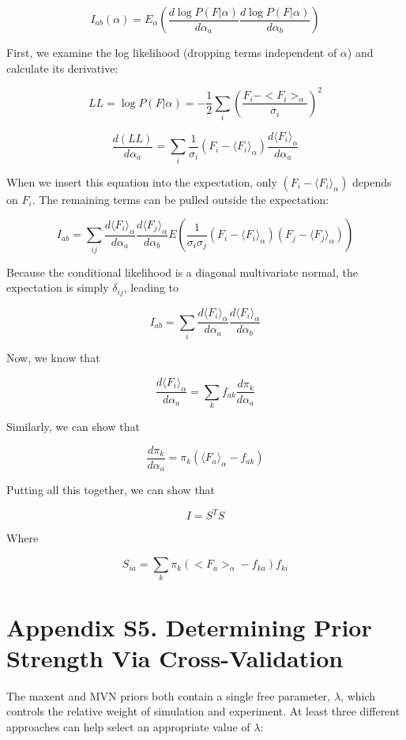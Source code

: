 \documentclass[journal=jacsat,manuscript=article]{achemso}
\begin{document}
$$I_{ab}(\alpha) = E_\alpha(\frac{d\log P(F|\alpha)}{d\alpha_{a}}\frac{d\log P(F|\alpha)}{d\alpha_{b}})$$

First, we examine the log likelihood (dropping terms independent of $\alpha$) and calculate its derivative:

$$LL = \log P(F|\alpha) = - \frac{1}{2}\sum_i (\frac{F_i - <F_i>_\alpha}{\sigma_i})^2$$

$$\frac{d(LL)}{d\alpha_a} = \sum_i \frac{1}{\sigma_i}(F_i - \langle F_i \rangle_\alpha) \frac{d\langle F_i \rangle_\alpha}{d\alpha_a}$$

When we insert this equation into the expectation, only $(F_i - \langle F_i \rangle_\alpha)$ depends on $F_i$.  The remaining terms can be pulled outside the expectation:

$$I_{ab} = \sum_{ij} \frac{d\langle F_i \rangle_\alpha}{d\alpha_a} \frac{d\langle F_j \rangle_\alpha}{d\alpha_b} E(\frac{1}{\sigma_i \sigma_j}(F_i - \langle F_i \rangle_\alpha)(F_j - \langle F_j \rangle_\alpha))$$

Because the conditional likelihood is a diagonal multivariate normal, the expectation is simply $\delta_{ij}$, leading to 

$$I_{ab} = \sum_{i} \frac{d\langle F_i \rangle_\alpha}{d\alpha_a} \frac{d\langle F_i \rangle_\alpha}{d\alpha_b} $$

Now, we know that 

$$\frac{d\langle F_i \rangle_\alpha}{d\alpha_a} = \sum_k f_{ak} \frac{d\pi_k}{d\alpha_a}$$

Similarly, we can show that

$$\frac{d\pi_k}{d\alpha_a} = \pi_k (\langle F_a \rangle_{\alpha} - f_{ak})$$


Putting all this together, we can show that

$$I = S^T S$$

Where 

$$S_{ia} = \sum_k \pi_k (<F_a>_\alpha - f_{ka}) f_{ki}$$

\newpage

\section{Appendix S5.  Determining Prior Strength Via Cross-Validation}

The maxent and MVN priors both contain a single free parameter, $\lambda$, which controls the relative weight of simulation and experiment.  At least three different approaches can help select an appropriate value of $\lambda$:
\end{document}
